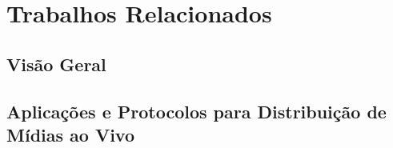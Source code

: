 \chapter{Trabalhos Relacionados}
\label{cap:relacionados}

% 
% 
% 
%
\section{Visão Geral}
\label{sec:relac_geral}

% 
% 
% 
%
\section{Aplicações e Protocolos para Distribuição de Mídias ao Vivo}
\label{sec:protocolos}